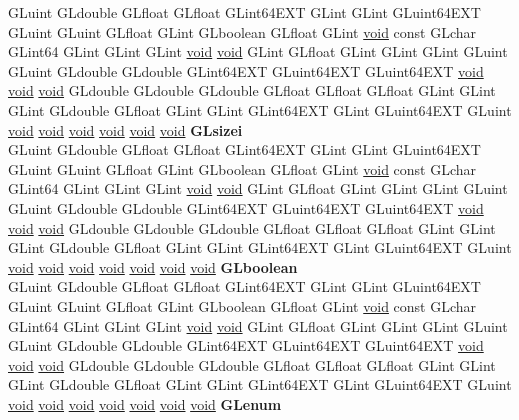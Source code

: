 \begin{DoxyCompactItemize}
\begin{tabbing}
\>GLuint GLdouble GLfloat GLfloat GLint64EXT GLint GLint GLuint64EXT GLuint GLuint GLfloat GLint GLboolean GLfloat GLint \hyperlink{interfacevoid}{void} const GLchar GLint64 GLint GLint GLint \hyperlink{interfacevoid}{void} \hyperlink{interfacevoid}{void} GLint GLfloat GLint GLint GLint GLuint GLuint GLdouble GLdouble GLint64EXT GLuint64EXT GLuint64EXT \hyperlink{interfacevoid}{void} \hyperlink{interfacevoid}{void} \hyperlink{interfacevoid}{void} GLdouble GLdouble GLdouble GLfloat GLfloat GLfloat GLint GLint GLint GLdouble GLfloat GLint GLint GLint64EXT GLint GLuint64EXT GLuint \hyperlink{interfacevoid}{void} \hyperlink{interfacevoid}{void} \hyperlink{interfacevoid}{void} \hyperlink{interfacevoid}{void} \hyperlink{interfacevoid}{void} \hyperlink{interfacevoid}{void} {\bfseries GLsizei}\\
\>GLuint GLdouble GLfloat GLfloat GLint64EXT GLint GLint GLuint64EXT GLuint GLuint GLfloat GLint GLboolean GLfloat GLint \hyperlink{interfacevoid}{void} const GLchar GLint64 GLint GLint GLint \hyperlink{interfacevoid}{void} \hyperlink{interfacevoid}{void} GLint GLfloat GLint GLint GLint GLuint GLuint GLdouble GLdouble GLint64EXT GLuint64EXT GLuint64EXT \hyperlink{interfacevoid}{void} \hyperlink{interfacevoid}{void} \hyperlink{interfacevoid}{void} GLdouble GLdouble GLdouble GLfloat GLfloat GLfloat GLint GLint GLint GLdouble GLfloat GLint GLint GLint64EXT GLint GLuint64EXT GLuint \hyperlink{interfacevoid}{void} \hyperlink{interfacevoid}{void} \hyperlink{interfacevoid}{void} \hyperlink{interfacevoid}{void} \hyperlink{interfacevoid}{void} \hyperlink{interfacevoid}{void} \hyperlink{interfacevoid}{void} {\bfseries GLboolean}\\
\>GLuint GLdouble GLfloat GLfloat GLint64EXT GLint GLint GLuint64EXT GLuint GLuint GLfloat GLint GLboolean GLfloat GLint \hyperlink{interfacevoid}{void} const GLchar GLint64 GLint GLint GLint \hyperlink{interfacevoid}{void} \hyperlink{interfacevoid}{void} GLint GLfloat GLint GLint GLint GLuint GLuint GLdouble GLdouble GLint64EXT GLuint64EXT GLuint64EXT \hyperlink{interfacevoid}{void} \hyperlink{interfacevoid}{void} \hyperlink{interfacevoid}{void} GLdouble GLdouble GLdouble GLfloat GLfloat GLfloat GLint GLint GLint GLdouble GLfloat GLint GLint GLint64EXT GLint GLuint64EXT GLuint \hyperlink{interfacevoid}{void} \hyperlink{interfacevoid}{void} \hyperlink{interfacevoid}{void} \hyperlink{interfacevoid}{void} \hyperlink{interfacevoid}{void} \hyperlink{interfacevoid}{void} \hyperlink{interfacevoid}{void} {\bfseries GLenum}\\

\end{tabbing}
\end{DoxyCompactItemize}
